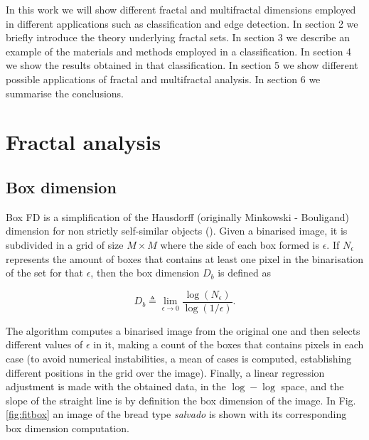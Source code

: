 \documentclass[oneside,a4paper,english,links]{article}
\begin{document}
In this work we will show different fractal and multifractal dimensions employed in different applications such as classification and edge detection. In section 2 we briefly introduce the theory underlying fractal sets. In section 3 we describe an example of the materials and methods employed in a classification. In section 4 we show the results obtained in that classification. In section 5 we show different possible applications of fractal and multifractal analysis. In section 6 we summarise the conclusions.

\section{Fractal analysis}
\subsection{Box dimension}
Box FD is a simplification of the Hausdorff (originally Minkowski - Bouligand) dimension for non strictly self-similar objects (\cite{Peitgen2004}). Given a binarised image, it is subdivided in a grid of size $M\times M$ where the side of each box formed is $\epsilon$. If $N_{\epsilon}$ represents the amount of boxes that contains at least one pixel in the binarisation of the set for that $\epsilon$, then the box dimension  $D_{b}$ is defined as

\begin{equation}
D_{b} \triangleq \displaystyle\lim_{\epsilon \to 0}{\frac{\log(N_{\epsilon})}{\log (1/\epsilon)}}.
\label{eqn:eqn1}
\end{equation}

The algorithm computes a binarised image from the original one and then selects different values of $\epsilon$ in it, making a count of the boxes that contains pixels in each case (to avoid numerical instabilities, a mean of cases is computed, establishing different positions in the grid over the image). Finally, a linear regression adjustment is made with the obtained data, in the $\log-\log$ space, and the slope of the straight line is by definition the box dimension of the image. In Fig. \ref{fig:fitbox} an image of the bread type {\em salvado} is shown with its corresponding box dimension computation.
\end{document}
